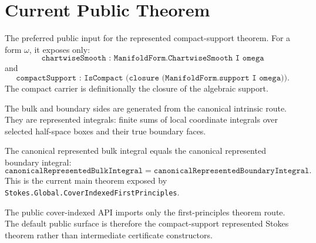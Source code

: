 \clearpage

\section{Current Public Theorem}
\label{sec:current_public_theorem}

\begin{definition}
  \label{def:first_principles_input}
  \leanok
  The preferred public input for the represented compact-support theorem.  For
  a form \(\omega\), it exposes only:
  \[
    \texttt{chartwiseSmooth : ManifoldForm.ChartwiseSmooth I omega}
  \]
  and
  \[
    \texttt{compactSupport : IsCompact (closure (ManifoldForm.support I omega))}.
  \]
  The compact carrier is definitionally the closure of the algebraic support.
\end{definition}

\begin{definition}
  \label{def:first_principles_endpoints}
  \leanok
  The bulk and boundary sides are generated from the canonical intrinsic route.
  They are represented integrals: finite sums of local coordinate integrals
  over selected half-space boxes and their true boundary faces.
\end{definition}

\begin{theorem}
  \label{thm:first_principles_represented_stokes}
  \leanok
  The canonical represented bulk integral equals the canonical represented
  boundary integral:
  \[
    \texttt{canonicalRepresentedBulkIntegral}
      =
    \texttt{canonicalRepresentedBoundaryIntegral}.
  \]
  This is the current main theorem exposed by
  \texttt{Stokes.Global.CoverIndexedFirstPrinciples}.
\end{theorem}

\begin{definition}
  \label{def:thin_public_import}
  \leanok
  The public cover-indexed API imports only the first-principles theorem route.
  The default public surface is therefore the compact-support represented
  Stokes theorem rather than intermediate certificate constructors.
\end{definition}


